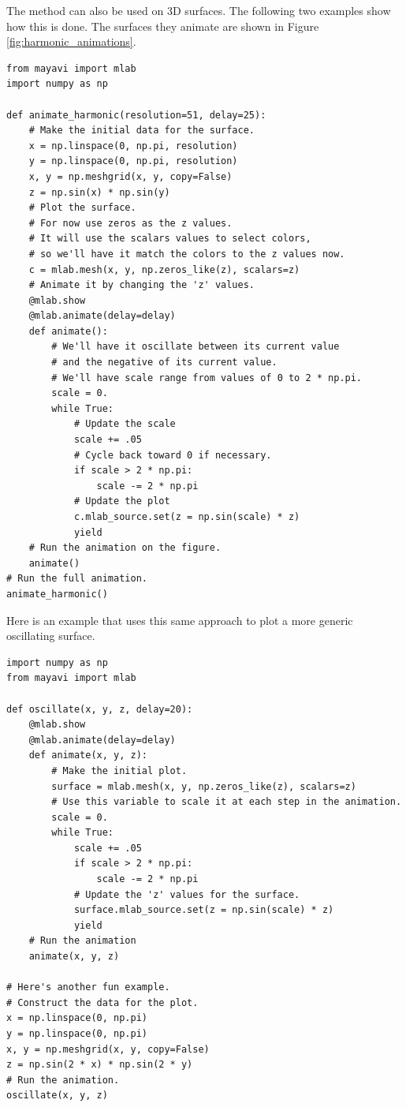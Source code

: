 The  method can also be used on 3D surfaces.
The following two examples show how this is done.
The surfaces they animate are shown in Figure \ref{fig:harmonic_animations}.
\begin{lstlisting}
from mayavi import mlab
import numpy as np

def animate_harmonic(resolution=51, delay=25):
    # Make the initial data for the surface.
    x = np.linspace(0, np.pi, resolution)
    y = np.linspace(0, np.pi, resolution)
    x, y = np.meshgrid(x, y, copy=False)
    z = np.sin(x) * np.sin(y)
    # Plot the surface.
    # For now use zeros as the z values.
    # It will use the scalars values to select colors,
    # so we'll have it match the colors to the z values now.
    c = mlab.mesh(x, y, np.zeros_like(z), scalars=z)
    # Animate it by changing the 'z' values.
    @mlab.show
    @mlab.animate(delay=delay)
    def animate():
        # We'll have it oscillate between its current value
        # and the negative of its current value.
        # We'll have scale range from values of 0 to 2 * np.pi.
        scale = 0.
        while True:
            # Update the scale
            scale += .05
            # Cycle back toward 0 if necessary.
            if scale > 2 * np.pi:
                scale -= 2 * np.pi
            # Update the plot
            c.mlab_source.set(z = np.sin(scale) * z)
            yield
    # Run the animation on the figure.
    animate()
# Run the full animation.
animate_harmonic()
\end{lstlisting}

Here is an example that uses this same approach to plot a more generic oscillating surface.
\begin{lstlisting}
import numpy as np
from mayavi import mlab

def oscillate(x, y, z, delay=20):
    @mlab.show
    @mlab.animate(delay=delay)
    def animate(x, y, z):
        # Make the initial plot.
        surface = mlab.mesh(x, y, np.zeros_like(z), scalars=z)
        # Use this variable to scale it at each step in the animation.
        scale = 0.
        while True:
            scale += .05
            if scale > 2 * np.pi:
                scale -= 2 * np.pi
            # Update the 'z' values for the surface.
            surface.mlab_source.set(z = np.sin(scale) * z)
            yield
    # Run the animation
    animate(x, y, z)

# Here's another fun example.
# Construct the data for the plot.
x = np.linspace(0, np.pi)
y = np.linspace(0, np.pi)
x, y = np.meshgrid(x, y, copy=False)
z = np.sin(2 * x) * np.sin(2 * y)
# Run the animation.
oscillate(x, y, z)
\end{lstlisting}

